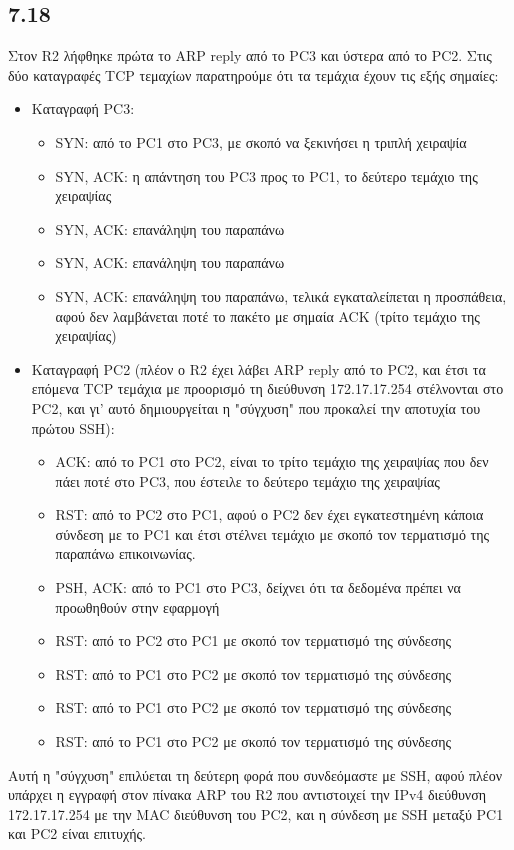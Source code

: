\documentclass[a4paper, 12pt]{article}
\begin{document}
	\subsection*{7.18} 
		Στον R2 λήφθηκε πρώτα το ARP reply από το PC3 και ύστερα από το PC2. Στις δύο καταγραφές TCP τεμαχίων παρατηρούμε ότι τα τεμάχια έχουν τις εξής σημαίες:
		
		\begin{itemize}
			\item Καταγραφή PC3:
				\begin{itemize}
					\item SYN: από το PC1 στο PC3, με σκοπό να ξεκινήσει η τριπλή χειραψία
					\item SYN, ACK: η απάντηση του PC3 προς το PC1, το δεύτερο τεμάχιο της χειραψίας
					\item SYN, ACK: επανάληψη του παραπάνω
					\item SYN, ACK: επανάληψη του παραπάνω
					\item SYN, ACK: επανάληψη του παραπάνω, τελικά εγκαταλείπεται η προσπάθεια, αφού δεν λαμβάνεται ποτέ το πακέτο με σημαία ACK (τρίτο τεμάχιο της χειραψίας)
				\end{itemize}
			\item Καταγραφή PC2 (πλέον ο R2 έχει λάβει ARP reply από το PC2, και έτσι τα επόμενα TCP τεμάχια με προορισμό τη διεύθυνση 172.17.17.254 στέλνονται στο PC2, και γι' αυτό δημιουργείται η "σύγχυση" που προκαλεί την αποτυχία του πρώτου SSH): 
				\begin{itemize}
					\item ACK: από το PC1 στο PC2, είναι το τρίτο τεμάχιο της χειραψίας που δεν πάει ποτέ στο PC3, που έστειλε το δεύτερο τεμάχιο της χειραψίας
					\item RST: από το PC2 στο PC1, αφού ο PC2 δεν έχει εγκατεστημένη κάποια σύνδεση με το PC1 και έτσι στέλνει τεμάχιο με σκοπό τον τερματισμό της παραπάνω επικοινωνίας.
					\item PSH, ACK: από το PC1 στο PC3, δείχνει ότι τα δεδομένα πρέπει να προωθηθούν στην εφαρμογή
					\item RST: από το PC2 στο PC1 με σκοπό τον τερματισμό της σύνδεσης
					\item RST: από το PC1 στο PC2 με σκοπό τον τερματισμό της σύνδεσης
					\item RST: από το PC1 στο PC2 με σκοπό τον τερματισμό της σύνδεσης
					\item RST: από το PC1 στο PC2 με σκοπό τον τερματισμό της σύνδεσης
				\end{itemize}
		\end{itemize} 
		
		Αυτή η "σύγχυση" επιλύεται τη δεύτερη φορά που συνδεόμαστε με SSH, αφού πλέον υπάρχει η εγγραφή στον πίνακα ARP του R2 που αντιστοιχεί την IPv4 διεύθυνση 172.17.17.254 με την MAC διεύθυνση του PC2, και η σύνδεση με SSH μεταξύ PC1 και PC2 είναι επιτυχής.
	
\end{document}

